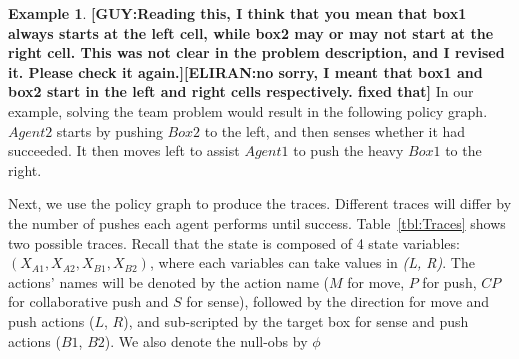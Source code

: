\documentclass[letterpaper]{article} %
\theoremstyle{definition}
\newtheorem{example}{Example}
\newcommand{\eliran}[1]{\textbf{[\color{red}ELIRAN:#1]}}
\newcommand{\guy}[1]{\textbf{[\color{orange}GUY:#1]}}
\begin{document}
\begin{example}
\guy{Reading this, I think that you mean that box1 always starts at the left cell, while box2 may or may not start at the right cell. This was not clear in the problem description, and I revised it. Please check it again.}\eliran{no sorry, I meant that box1 and box2 start in the left and right cells respectively. fixed that}
In our example, solving the team problem would result in the following policy graph. 
$Agent2$ starts by pushing $Box2$ to the left, and then senses whether it had succeeded. It then moves left to assist $Agent1$ to push the heavy $Box1$ to the right.

Next, we use the policy graph to produce the traces. Different
traces will differ by the number of pushes each agent performs until success.
Table~\ref{tbl:Traces} shows two possible traces.
Recall that the state is composed of 4 state variables: $(X_{A1}, X_{A2}, X_{B1}, X_{B2})$, where each variables can take values in \emph{(L, R)}. The actions' names will be denoted by the action name ($M$ for move, $P$ for push, $CP$ for collaborative push and $S$ for sense),
followed by the direction for move and push actions ($L$, $R$), and sub-scripted by the target box for sense and push actions ($B1$, $B2$).
We also denote the null-obs by $\phi$



\end{example}
\end{document}

